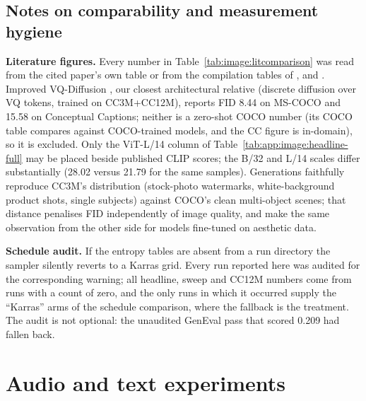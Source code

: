 \subsection{Notes on comparability and measurement hygiene}
\label{app:image:repro}

\textbf{Literature figures.} Every number in Table~\ref{tab:image:litcomparison} was read from
the cited paper's own table or from the compilation tables of \citet{image:showo},
\citet{image:unidiffuser} and \citet{image:lafite}. Improved VQ-Diffusion
\citep{image:vqdiffusion-improved}, our closest architectural relative (discrete diffusion over
VQ tokens, trained on CC3M+CC12M), reports FID 8.44 on MS-COCO and 15.58 on Conceptual Captions;
neither is a zero-shot COCO number (its COCO table compares against COCO-trained models, and the
CC figure is in-domain), so it is excluded. Only the ViT-L/14 column of
Table~\ref{tab:app:image:headline-full} may be placed beside published CLIP scores; the B/32 and
L/14 scales differ substantially (28.02 versus 21.79 for the same samples). Generations
faithfully reproduce CC3M's distribution (stock-photo watermarks, white-background product shots,
single subjects) against COCO's clean multi-object scenes; that distance penalises FID
independently of image quality, and \citet{image:showo} make the same observation from the other
side for models fine-tuned on aesthetic data.

\textbf{Schedule audit.} If the entropy tables are absent from a run directory the sampler
silently reverts to a Karras grid. Every run reported here was audited for the corresponding
warning; all headline, sweep and CC12M numbers come from runs with a count of zero, and the only
runs in which it occurred supply the ``Karras'' arms of the schedule comparison, where the
fallback is the treatment. The audit is not optional: the unaudited GenEval pass that scored
0.209 had fallen back.

\section{Audio and text experiments}
\label{app:audio}




